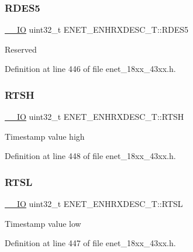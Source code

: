 \subsubsection{\texorpdfstring{R\+D\+E\+S5}{RDES5}}
{\footnotesize\ttfamily \hyperlink{core__sc300_8h_aec43007d9998a0a0e01faede4133d6be}{\+\_\+\+\_\+\+IO} uint32\+\_\+t E\+N\+E\+T\+\_\+\+E\+N\+H\+R\+X\+D\+E\+S\+C\+\_\+\+T\+::\+R\+D\+E\+S5}

Reserved 

Definition at line 446 of file enet\+\_\+18xx\+\_\+43xx.\+h.

\mbox{\label{struct_e_n_e_t___e_n_h_r_x_d_e_s_c___t_a65b235c82d60b315c1737d45ee7fd476}} 
\subsubsection{\texorpdfstring{R\+T\+SH}{RTSH}}
{\footnotesize\ttfamily \hyperlink{core__sc300_8h_aec43007d9998a0a0e01faede4133d6be}{\+\_\+\+\_\+\+IO} uint32\+\_\+t E\+N\+E\+T\+\_\+\+E\+N\+H\+R\+X\+D\+E\+S\+C\+\_\+\+T\+::\+R\+T\+SH}

Timestamp value high 

Definition at line 448 of file enet\+\_\+18xx\+\_\+43xx.\+h.

\mbox{\label{struct_e_n_e_t___e_n_h_r_x_d_e_s_c___t_a646c7825a53c70e1ee3e09e2f74cdec8}} 
\subsubsection{\texorpdfstring{R\+T\+SL}{RTSL}}
{\footnotesize\ttfamily \hyperlink{core__sc300_8h_aec43007d9998a0a0e01faede4133d6be}{\+\_\+\+\_\+\+IO} uint32\+\_\+t E\+N\+E\+T\+\_\+\+E\+N\+H\+R\+X\+D\+E\+S\+C\+\_\+\+T\+::\+R\+T\+SL}

Timestamp value low 

Definition at line 447 of file enet\+\_\+18xx\+\_\+43xx.\+h.

